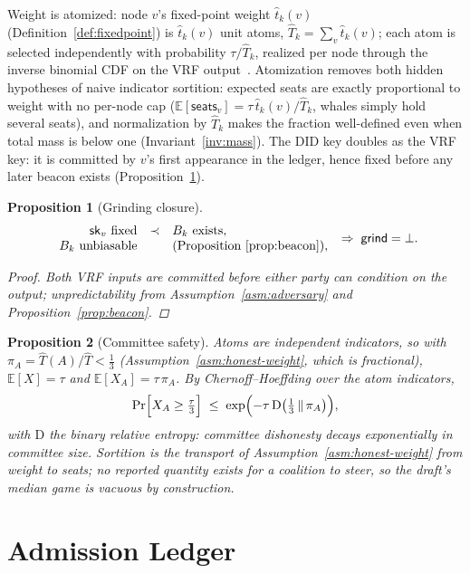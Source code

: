 \documentclass[11pt,letterpaper]{article}
\newtheorem{proposition}{Proposition}
\begin{document}
Weight is atomized: node $v$'s fixed-point weight $\hat t_k(v)$
(Definition~\ref{def:fixedpoint}) is $\hat t_k(v)$ unit atoms,
$\hat T_k=\sum_v\hat t_k(v)$; each atom is selected independently with
probability $\tau/\hat T_k$, realized per node through the inverse
binomial CDF on the VRF output~\cite{Algorand}.  Atomization removes
both hidden hypotheses of naive indicator sortition: expected seats are
exactly proportional to weight with no per-node cap
($\mathbb{E}[\mathsf{seats}_v]=\tau\,\hat t_k(v)/\hat T_k$, whales
simply hold several seats), and normalization by $\hat T_k$ makes the
fraction well-defined even when total mass is below one
(Invariant~\ref{inv:mass}).  The DID key doubles as the VRF key: it is
committed by $v$'s first appearance in the ledger, hence fixed before
any later beacon exists (Proposition~\ref{prop:grind}).

\begin{proposition}[Grinding closure]\label{prop:grind}
\[
\begin{array}{rcl}
\mathsf{sk}_v\ \text{fixed}&\prec&B_k\ \text{exists},\\
B_k\ \text{unbiasable}&&\text{(Proposition~\ref{prop:beacon})},
\end{array}
\;\Rightarrow\;
\mathsf{grind}=\bot .
\]
\begin{proof}
Both VRF inputs are committed before either party can condition on the
output; unpredictability from Assumption~\ref{asm:adversary} and
Proposition~\ref{prop:beacon}.
\end{proof}
\end{proposition}

\begin{proposition}[Committee safety]\label{prop:committee}
Atoms are independent indicators, so with
$\pi_A=\hat T(A)/\hat T<\tfrac13$
(Assumption~\ref{asm:honest-weight}, which is fractional),
$\mathbb{E}[X]=\tau$ and $\mathbb{E}[X_A]=\tau\,\pi_A$.  By
Chernoff--Hoeffding over the atom indicators,
\[
\Pr\Bigl[X_A\geq\tfrac{\tau}{3}\Bigr]
\;\leq\;
\exp\Bigl(-\tau\,\mathrm{D}\bigl(\tfrac13\,\Vert\,\pi_A\bigr)\Bigr),
\]
with $\mathrm{D}$ the binary relative entropy: committee dishonesty decays
exponentially in committee size.  Sortition is the transport of
Assumption~\ref{asm:honest-weight} from weight to seats; no reported
quantity exists for a coalition to steer, so the draft's median game is
vacuous by construction.
\end{proposition}

\section{Admission Ledger}\label{sec:ledger}
\end{document}
